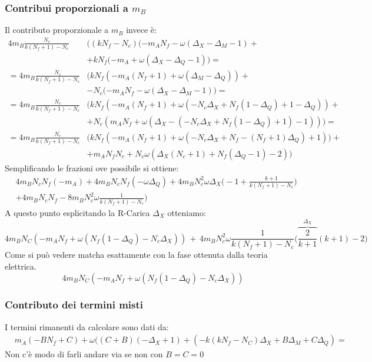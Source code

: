 \documentclass[a4paper,12pt]{article}
\begin{document}
\subsubsection{Contribui  proporzionali a $m_B$}
Il contributo proporzionale a $m_B$ invece è:
\begin{align*}
 4 m_B \frac{N_c}{k(N_f+1)-N_c} & \bigg( (k N_f - N_c ) ( -m_A N_f - \omega ( \Delta_X - \Delta_M -1) +\\
 & +  k N_f ( -m_A + \omega ( \Delta_X - \Delta_Q -1) \bigg) = \\
 =   4 m_B \frac{N_c}{k(N_f+1)-N_c} & \bigg ( k N_f ( - m_A (N_f+1)  +\omega( \Delta_M - \Delta_Q)) +\\
 & - N_c ( - m_A N_f - \omega( \Delta_X - \Delta_M-1) \bigg) = \\
 = 4 m_B \frac{N_c}{k(N_f+1)-N_c} & \bigg ( k N_f ( - m_A (N_f+1) + \omega ( - N_c \Delta_X + N_f( 1- \Delta_Q) + 1  - \Delta_Q) ) + \\
 & + N_c (  m_A N_f +  \omega( \Delta_X - (- N_c \Delta_X + N_f( 1- \Delta_Q) + 1)-1) ) \bigg) = \\
  =  4 m_B \frac{N_c}{k(N_f+1)-N_c} & \bigg ( k N_f ( - m_A (N_f+1) +\omega( - N_c \Delta_X + N_f - (N_f+1) \Delta_Q) + 1)) +\\
  & + m_A N_f N_c   + N_c \omega  (    \Delta_X (N_c+1) + N_f( \Delta_Q - 1) - 2) \bigg)
\end{align*}
Semplificando le frazioni ove possibile si ottiene:
\begin{align*}
& 4 m_B N_c N_f (-m_A) + 4 m_B N_c N_f ( - \omega \Delta_Q)  + 4 m_B N_c^2 \omega \Delta_X \bigg(- 1 + \frac{k+1}{k (N_f+1)-N_c} \bigg) \\
& + 4 m_B N_c N_f   -8m_B N_c^2 \omega \frac{1}{k (N_f+1) - N_c}  \bigg)
\end{align*}
A questo punto esplicitando la R-Carica $\Delta_X$ otteniamo:
\begin{equation}
	4 m_B N_C ( - m_A N_f + \omega ( N_f ( 1 - \Delta_Q) - N_c \Delta_X )) \, + \, 4 m_B N_c^2 \omega \frac{1}{k (N_f+1)-N_c} \bigg( \overbrace{\frac{2}{k+1}}^{\Delta_X} (k+1) - 2 \bigg) 	
\end{equation}
Come si può vedere matcha esattamente con la fase ottenuta dalla teoria elettrica.
\begin{equation}
4 m_B N_C ( - m_A N_f + \omega ( N_f ( 1 - \Delta_Q) - N_c \Delta_X ))
\end{equation}

\subsubsection{Contributo dei termini misti}
I termini rimanenti da calcolare sono dati da:
\begin{align*}
 & m_A(- B N_f + C ) + \omega ( (C+B) ( -\Delta_X + 1)+( -k (k N_f -N_C) \Delta_X  + B \Delta_M + C \Delta_Q) = 
\end{align*}
Non c'è modo di farli andare via se non con $ B = C = 0$
\end{document}
